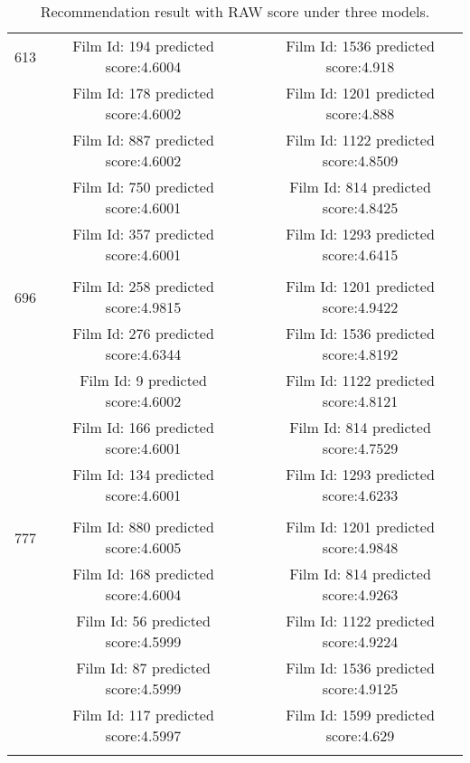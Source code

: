 \begin{longtable}{|c|c|c|c|}
           &            &            &            \\
\hline
\multicolumn{ 1}{|c|}{613} & Film Id: 194 predicted score:4.6004 &            & Film Id: 1536 predicted score:4.918 \\
\hline
\multicolumn{ 1}{|c|}{} & Film Id: 178 predicted score:4.6002 &            & Film Id: 1201 predicted score:4.888 \\
\hline
\multicolumn{ 1}{|c|}{} & Film Id: 887 predicted score:4.6002 &            & Film Id: 1122 predicted score:4.8509 \\
\hline
\multicolumn{ 1}{|c|}{} & Film Id: 750 predicted score:4.6001 &            & Film Id: 814 predicted score:4.8425 \\
\hline
\multicolumn{ 1}{|c|}{} & Film Id: 357 predicted score:4.6001 &            & Film Id: 1293 predicted score:4.6415 \\
\hline
           &            &            &            \\
\hline
\multicolumn{ 1}{|c|}{696} & Film Id: 258 predicted score:4.9815 &            & Film Id: 1201 predicted score:4.9422 \\
\hline
\multicolumn{ 1}{|c|}{} & Film Id: 276 predicted score:4.6344 &            & Film Id: 1536 predicted score:4.8192 \\
\hline
\multicolumn{ 1}{|c|}{} & Film Id: 9 predicted score:4.6002 &            & Film Id: 1122 predicted score:4.8121 \\
\hline
\multicolumn{ 1}{|c|}{} & Film Id: 166 predicted score:4.6001 &            & Film Id: 814 predicted score:4.7529 \\
\hline
\multicolumn{ 1}{|c|}{} & Film Id: 134 predicted score:4.6001 &            & Film Id: 1293 predicted score:4.6233 \\
\hline
           &            &            &            \\
\hline
\multicolumn{ 1}{|c|}{777} & Film Id: 880 predicted score:4.6005 &            & Film Id: 1201 predicted score:4.9848 \\
\hline
\multicolumn{ 1}{|c|}{} & Film Id: 168 predicted score:4.6004 &            & Film Id: 814 predicted score:4.9263 \\
\hline
\multicolumn{ 1}{|c|}{} & Film Id: 56 predicted score:4.5999 &            & Film Id: 1122 predicted score:4.9224 \\
\hline
\multicolumn{ 1}{|c|}{} & Film Id: 87 predicted score:4.5999 &            & Film Id: 1536 predicted score:4.9125 \\
\hline
\multicolumn{ 1}{|c|}{} & Film Id: 117 predicted score:4.5997 &            & Film Id: 1599 predicted score:4.629 \\
\hline
\caption{Recommendation result with RAW score under three models.}
\end{longtable} 

